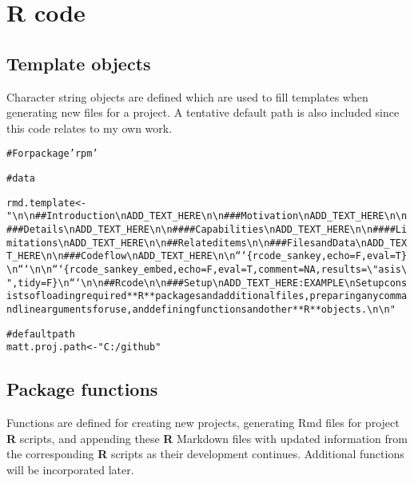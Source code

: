 \documentclass{article}\usepackage[]{graphicx}\usepackage[]{color}
\makeatletter
\newcommand{\hlstr}[1]{\textcolor[rgb]{0.863,0.196,0.184}{#1}}%
\newcommand{\hlcom}[1]{\textcolor[rgb]{0.345,0.431,0.459}{#1}}%
\newcommand{\hlstd}[1]{\textcolor[rgb]{0.514,0.58,0.588}{#1}}%
\newcommand{\hlkwb}[1]{\textcolor[rgb]{0.522,0.6,0}{#1}}%
\newenvironment{kframe}{%
 \def\at@end@of@kframe{}%
 \ifinner\ifhmode%
  \def\at@end@of@kframe{\end{minipage}}%
  \begin{minipage}{\columnwidth}%
 \fi\fi%
 \def\FrameCommand##1{\hskip\@totalleftmargin \hskip-\fboxsep
 \colorbox{shadecolor}{##1}\hskip-\fboxsep
     \hskip-\linewidth \hskip-\@totalleftmargin \hskip\columnwidth}%
 \MakeFramed {\advance\hsize-\width
   \@totalleftmargin\z@ \linewidth\hsize
   \@setminipage}}%
 {\par\unskip\endMakeFramed%
 \at@end@of@kframe}
\newenvironment{knitrout}{}{} %
\makeatother
\begin{document}
\section{\textbf{R} code}

\subsection{Template objects}
Character string objects are defined which are used to fill templates when generating new files for a project.
A tentative default path is also included since this code relates to my own work.

\begin{knitrout}
\color{fgcolor}\begin{kframe}
\begin{alltt}
\hlcom{# For package 'rpm'}

\hlcom{# data}

\hlstd{rmd.template} \hlkwb{<-} \hlstr{"\textbackslash{}n\textbackslash{}n## Introduction\textbackslash{}nADD_TEXT_HERE\textbackslash{}n\textbackslash{}n### Motivation\textbackslash{}nADD_TEXT_HERE\textbackslash{}n\textbackslash{}n### Details\textbackslash{}nADD_TEXT_HERE\textbackslash{}n\textbackslash{}n#### Capabilities\textbackslash{}nADD_TEXT_HERE\textbackslash{}n\textbackslash{}n#### Limitations\textbackslash{}nADD_TEXT_HERE\textbackslash{}n\textbackslash{}n## Related items\textbackslash{}n\textbackslash{}n### Files and Data\textbackslash{}nADD_TEXT_HERE\textbackslash{}n\textbackslash{}n### Code flow\textbackslash{}nADD_TEXT_HERE\textbackslash{}n\textbackslash{}n```\{r code_sankey, echo=F, eval=T\}\textbackslash{}n```\textbackslash{}n\textbackslash{}n```\{r code_sankey_embed, echo=F, eval=T, comment=NA, results=\textbackslash{}"asis\textbackslash{}", tidy=F\}\textbackslash{}n```\textbackslash{}n\textbackslash{}n## R code\textbackslash{}n\textbackslash{}n### Setup\textbackslash{}nADD_TEXT_HERE: EXAMPLE\textbackslash{}nSetup consists of loading required **R** packages and additional files, preparing any command line arguments for use, and defining functions and other **R** objects.\textbackslash{}n\textbackslash{}n"}

\hlcom{# default path}
\hlstd{matt.proj.path} \hlkwb{<-} \hlstr{"C:/github"}
\end{alltt}
\end{kframe}
\end{knitrout}

\subsection{Package functions}
Functions are defined for creating new projects, generating Rmd files for project \textbf{R} scripts,
and appending these \textbf{R} Markdown files with updated information from the corresponding \textbf{R} scripts as their development continues.
Additional functions will be incorporated later.
\end{document}
